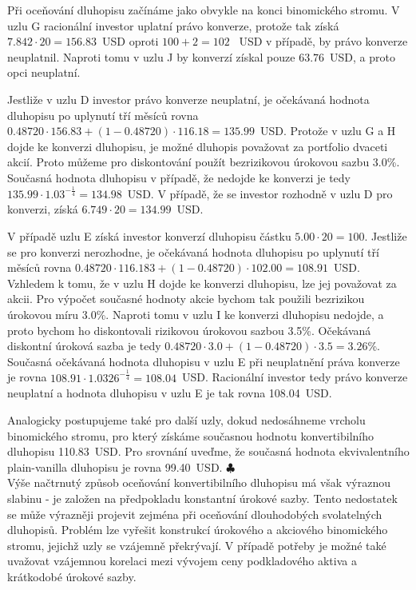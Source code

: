 \documentclass[a4paper]{book}
\begin{document}
Při oceňování dluhopisu začínáme jako obvykle na konci binomického stromu. V uzlu G racionální investor uplatní právo konverze, protože tak získá $7.842 \cdot 20 = 156.83$~USD oproti $100 + 2 = 102$~ USD v případě, by právo konverze neuplatnil. Naproti tomu v uzlu J by konverzí získal pouze $63.76$~USD, a proto opci neuplatní.

Jestliže v uzlu D investor právo konverze neuplatní, je očekávaná hodnota dluhopisu po uplynutí tří měsíců rovna $0.48720 \cdot 156.83 + (1-0.48720) \cdot 116.18 = 135.99$~USD. Protože v uzlu G a H dojde ke konverzi dluhopisu, je možné dluhopis považovat za portfolio dvaceti akcií. Proto můžeme pro diskontování použít bezrizikovou úrokovou sazbu 3.0\%. Současná hodnota dluhopisu v případě, že nedojde ke konverzi je tedy $135.99 \cdot 1.03^{-\frac{1}{4}} = 134.98$~USD. V případě, že se investor rozhodně v uzlu D pro konverzi, získá $6.749 \cdot 20 = 134.99$~USD.

V případě uzlu E získá investor konverzí dluhopisu částku $5.00 \cdot 20 = 100$. Jestliže se pro konverzi nerozhodne, je očekávaná hodnota dluhopisu po uplynutí tří měsíců rovna $0.48720 \cdot 116.183 + (1 - 0.48720) \cdot 102.00 = 108.91$~USD. Vzhledem k tomu, že v uzlu H dojde ke konverzi dluhopisu, lze jej považovat za akcii. Pro výpočet současné hodnoty akcie bychom tak použili bezrizikou úrokovou míru 3.0\%. Naproti tomu v uzlu I ke konverzi dluhopisu nedojde, a proto bychom ho diskontovali rizikovou úrokovou sazbou 3.5\%. Očekávaná diskontní úroková sazba je tedy $0.48720 \cdot 3.0 + (1 - 0.48720) \cdot 3.5 = 3.26$\%. Současná očekávaná hodnota dluhopisu v uzlu E při neuplatnění práva konverze je rovna $108.91 \cdot 1.0326^{-\frac{1}{4}} = 108.04$~USD. Racionální investor tedy právo konverze neuplatní a hodnota dluhopisu v uzlu E je tak rovna 108.04~USD.

Analogicky postupujeme také pro další uzly, dokud nedosáhneme vrcholu binomického stromu, pro který získáme současnou hodnotu konvertibilního dluhopisu 110.83~USD. Pro srovnání uveďme, že současná hodnota ekvivalentního plain-vanilla dluhopisu je rovna 99.40~USD. $\clubsuit$\\

Výše načtrnutý způsob oceňování konvertibilního dluhopisu má však výraznou slabinu - je založen na předpokladu konstantní úrokové sazby. Tento nedostatek se může výrazněji projevit zejména při oceňování dlouhodobých svolatelných dluhopisů. Problém lze vyřešit konstrukcí úrokového a akciového binomického stromu, jejichž uzly se vzájemně překrývají. V případě potřeby je možné také uvažovat vzájemnou korelaci mezi vývojem ceny podkladového aktiva a krátkodobé úrokové sazby.
\end{document}
